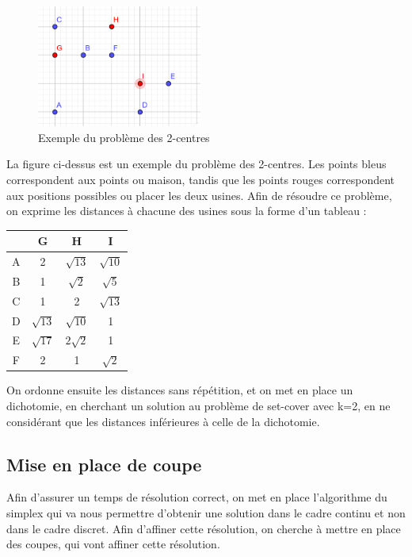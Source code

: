 \documentclass[12pt]{report}
\begin{document}
\begin{figure}[h!]
  \centering
  \includegraphics[height=4cm]{exemple_P_centre.png}
  \caption{Exemple du problème des 2-centres}
  \label{fig:2-Centre}
\end{figure}
La figure ci-dessus est un exemple du problème des 2-centres. Les points bleus correspondent aux points ou maison, tandis que les points rouges correspondent aux positions possibles ou placer les deux usines.
\newline
Afin de résoudre ce problème, on exprime les distances à chacune des usines sous la forme d'un tableau :
\begin{center}
\begin{tabular}{ | c | c | c | c | }
    \hline
    & G & H & I \\ \hline
    A & 2 & $\sqrt{13}$ & $\sqrt{10}$ \\ \hline
    B & 1 & $\sqrt{2}$ & $\sqrt{5}$ \\ \hline
    C & 1 & 2 & $\sqrt{13}$ \\ \hline
    D & $\sqrt{13}$ & $\sqrt{10}$ & 1 \\ \hline
    E & $\sqrt{17}$ & $2\sqrt{2}$ & 1 \\ \hline
    F & 2 & 1 & $\sqrt{2}$ \\ \hline
\end{tabular}
\end{center}
On ordonne ensuite les distances sans répétition, et on met en place un dichotomie, en cherchant un solution au problème de set-cover avec k=2, en ne considérant que les distances inférieures à celle de la dichotomie.

\subsection{Mise en place de coupe}
Afin d'assurer un temps de résolution correct, on met en place l'algorithme du simplex qui va nous permettre d'obtenir une solution dans le cadre continu et non dans le cadre discret. Afin d'affiner cette résolution, on cherche à mettre en place des coupes, qui vont affiner cette résolution.
\end{document}
